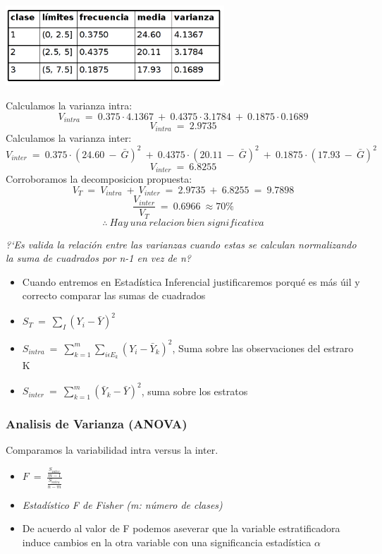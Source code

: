 	\begin{center}                                           	
        	\includegraphics[height=3cm]{images/cap3_ej1_4}
        \end{center}
	Calculamos la varianza intra:
	$$V_{intra}\ =\ 0.375\cdot 4.1367\ +\ 0.4375\cdot 3.1784\ +\ 0.1875\cdot 0.1689$$
	$$V_{intra}\ =\ 2.9735$$
	Calculamos la varianza inter:
       	$$V_{inter}\ =\ 0.375\cdot (24.60\ -\ \bar{G})^2\ +\ 0.4375\cdot (20.11\ -\ \bar{G})^2\ +\ 0.1875\cdot (17.93\ -\ \bar{G})^2$$
       	$$V_{inter}\ =\ 6.8255$$
	Corroboramos la decomposicion propuesta:
	$$V_{T}\ =\ V_{intra}\ +\ V_{inter}\ =\ 2.9735\ +\ 6.8255\ =\ 9.7898$$
	$$\frac{V_{inter}}{V_{T}}\ =\ 0.6966\ \approx 70\%$$
	$$\therefore \ Hay\ una\ relacion\ bien\ significativa$$


	\emph{?`Es valida la relaci\'on entre las varianzas cuando estas se calculan normalizando la suma de cuadrados por n-1 en vez de n?}
	\begin{itemize}
		\item Cuando entremos en Estad\'istica Inferencial justificaremos porqu\'e es m\'as \'uil y correcto comparar las sumas de cuadrados
		\item $S_{T}\ =\ \sum_{I}(Y_{i}-\bar{Y})^{2}$
		\item $S_{intra}\ =\ \sum_{k=1}^{m}\sum_{i\epsilon E_{k}}(Y_{i}-\bar{Y}_{k})^2$, Suma sobre las observaciones del estraro K
		\item $S_{inter}\ =\ \sum_{k=1}^{m}(\bar{Y}_{k}-\bar{Y})^{2}$, suma sobre los estratos
	\end{itemize}
\subsubsection{Analisis de Varianza (ANOVA)}
	Comparamos la variabilidad intra versus la inter.
	\begin{itemize}
		\item $F\ =\ \frac{\frac{S_{inter}}{m-1}}{\frac{S_{intra}}{n-m}}$
		\item \emph{Estad\'istico F de Fisher (m: n\'umero de clases)}
		\item De acuerdo al valor de F podemos aseverar que la variable estratificadora induce cambios en la otra variable con una significancia estadística $\alpha$
	\end{itemize}
